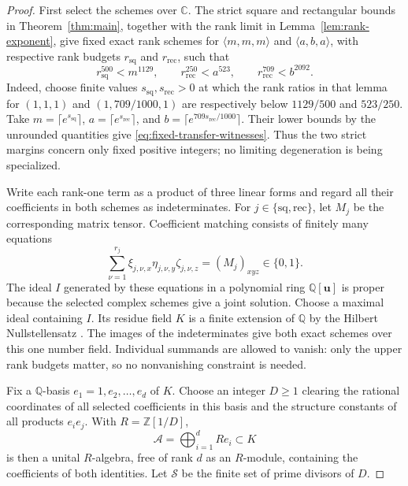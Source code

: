 \documentclass[11pt]{article}
\numberwithin{equation}{section}
\theoremstyle{definition}
\theoremstyle{remark}
\newcommand{\C}{\mathbb C}
\begin{document}
\begin{proof}
First select the schemes over \(\C\).  The strict square and rectangular
bounds in Theorem~\ref{thm:main}, together with the rank limit in
Lemma~\ref{lem:rank-exponent}, give fixed exact rank schemes for
\(\langle m,m,m\rangle\) and \(\langle a,b,a\rangle\), with respective
rank budgets \(r_{\mathrm{sq}}\) and \(r_{\mathrm{rec}}\), such that
\begin{equation}\label{eq:fixed-transfer-witnesses}
 r_{\mathrm{sq}}^{500}<m^{1129},\qquad
 r_{\mathrm{rec}}^{250}<a^{523},\qquad
 r_{\mathrm{rec}}^{709}<b^{2092}.
\end{equation}
Indeed, choose finite values \(s_{\mathrm{sq}},s_{\mathrm{rec}}>0\)
at which the rank ratios in that lemma for \((1,1,1)\) and
\((1,709/1000,1)\) are respectively below \(1129/500\) and \(523/250\).
Take \(m=\lceil e^{s_{\mathrm{sq}}}\rceil\),
\(a=\lceil e^{s_{\mathrm{rec}}}\rceil\), and
\(b=\lceil e^{709s_{\mathrm{rec}}/1000}\rceil\).  Their lower bounds
by the unrounded quantities give \eqref{eq:fixed-transfer-witnesses}.
Thus the two strict margins concern only fixed positive integers;
no limiting degeneration is being specialized.

Write each rank-one term as a product of three linear forms and regard
all their coefficients in both schemes as indeterminates.  For
\(j\in\{\mathrm{sq},\mathrm{rec}\}\), let \(M_j\) be the corresponding
matrix tensor.  Coefficient matching consists of
finitely many equations
\[
 \sum_{\nu=1}^{r_j}
 \xi_{j,\nu,x}\eta_{j,\nu,y}\zeta_{j,\nu,z}
 =(M_j)_{xyz}\in\{0,1\}.
\]
The ideal \(I\) generated by these equations in a polynomial ring
\(\mathbb Q[\mathbf u]\) is proper because the selected complex
schemes give a joint solution.  Choose a maximal ideal containing
\(I\).  Its residue field \(K\) is a finite extension of \(\mathbb Q\)
by the Hilbert Nullstellensatz
\cite[Theorem~10.34.1, Tag~00FV]{stacks-nullstellensatz}.
The images of the indeterminates give both exact schemes over this
one number field.  Individual summands are allowed to vanish: only
the upper rank budgets matter, so no nonvanishing constraint is needed.

Fix a \(\mathbb Q\)-basis \(e_1=1,e_2,\ldots,e_d\) of \(K\).
Choose an integer \(D\ge1\) clearing the rational coordinates of all
selected coefficients in this basis and the structure constants of
all products \(e_i e_j\).  With \(R=\mathbb Z[1/D]\),
\[
 \mathcal A=\bigoplus_{i=1}^d R e_i\subset K
\]
is then a unital \(R\)-algebra, free of rank \(d\) as an \(R\)-module,
containing the coefficients of both identities.  Let \(\mathcal S\)
be the finite set of prime divisors of \(D\).


\end{proof}
\end{document}

